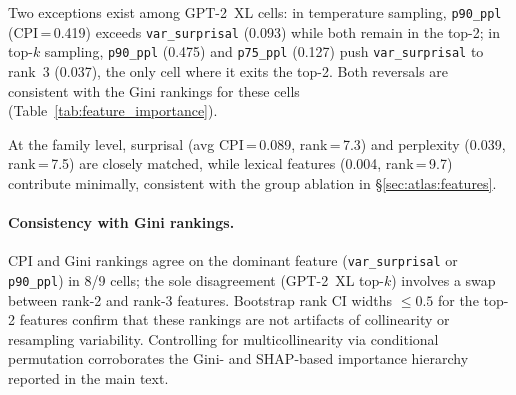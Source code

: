 \begin{table}[h]
\centering
\small
\caption{Conditional permutation importance aggregated across 9 model$\times$strategy cells (1{,}000 bootstrap resamples). Avg Rank and Avg CPI: means over cells. Rank CI Width: mean 95\% bootstrap CI width for the rank. Bottom rows: feature-family averages.}
\label{tab:conditional_pi}
\end{table}

Two exceptions exist among GPT-2~XL cells: in temperature sampling, \texttt{p90\_ppl} (CPI\,=\,0.419) exceeds \texttt{var\_surprisal} (0.093) while both remain in the top-2; in top-$k$ sampling, \texttt{p90\_ppl} (0.475) and \texttt{p75\_ppl} (0.127) push \texttt{var\_surprisal} to rank~3 (0.037), the only cell where it exits the top-2.
Both reversals are consistent with the Gini rankings for these cells (Table~\ref{tab:feature_importance}).

At the family level, surprisal (avg CPI\,=\,0.089, rank\,=\,7.3) and perplexity (0.039, rank\,=\,7.5) are closely matched, while lexical features (0.004, rank\,=\,9.7) contribute minimally, consistent with the group ablation in \S\ref{sec:atlas:features}.

\paragraph{Consistency with Gini rankings.}
CPI and Gini rankings agree on the dominant feature (\texttt{var\_surprisal} or \texttt{p90\_ppl}) in 8/9 cells; the sole disagreement (GPT-2~XL top-$k$) involves a swap between rank-2 and rank-3 features.
Bootstrap rank CI widths $\leq 0.5$ for the top-2 features confirm that these rankings are not artifacts of collinearity or resampling variability.
Controlling for multicollinearity via conditional permutation corroborates the Gini- and SHAP-based importance hierarchy reported in the main text.

